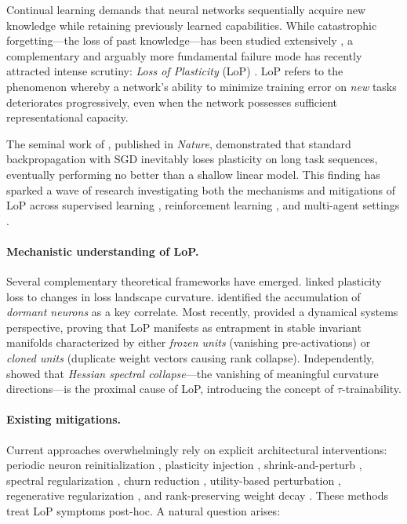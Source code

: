 \documentclass{article}
\theoremstyle{plain}
\theoremstyle{definition}
\theoremstyle{remark}
\begin{document}
Continual learning demands that neural networks sequentially acquire new knowledge while retaining previously learned capabilities. While catastrophic forgetting---the loss of past knowledge---has been studied extensively \citep{kirkpatrick2017ewc}, a complementary and arguably more fundamental failure mode has recently attracted intense scrutiny: \emph{Loss of Plasticity} (LoP) \citep{dohare2024loss, lyle2023understanding}. LoP refers to the phenomenon whereby a network's ability to minimize training error on \emph{new} tasks deteriorates progressively, even when the network possesses sufficient representational capacity.

The seminal work of \citet{dohare2024loss}, published in \emph{Nature}, demonstrated that standard backpropagation with SGD inevitably loses plasticity on long task sequences, eventually performing no better than a shallow linear model. This finding has sparked a wave of research investigating both the mechanisms and mitigations of LoP across supervised learning \citep{lewandowski2025spectral, farias2025snr, shin2024dash}, reinforcement learning \citep{sokar2023dormant, nikishin2023plasticity, juliani2024plasticity, tang2025mitigating}, and multi-agent settings \citep{qin2024reborn}.

\paragraph{Mechanistic understanding of LoP.} Several complementary theoretical frameworks have emerged. \citet{lyle2023understanding} linked plasticity loss to changes in loss landscape curvature. \citet{sokar2023dormant} identified the accumulation of \emph{dormant neurons} as a key correlate. Most recently, \citet{joudaki2026barriers} provided a dynamical systems perspective, proving that LoP manifests as entrapment in stable invariant manifolds characterized by either \emph{frozen units} (vanishing pre-activations) or \emph{cloned units} (duplicate weight vectors causing rank collapse). Independently, \citet{he2025spectral} showed that \emph{Hessian spectral collapse}---the vanishing of meaningful curvature directions---is the proximal cause of LoP, introducing the concept of $\tau$-trainability.

\paragraph{Existing mitigations.} Current approaches overwhelmingly rely on explicit architectural interventions: periodic neuron reinitialization \citep{sokar2023dormant, farias2025snr}, plasticity injection \citep{nikishin2023plasticity}, shrink-and-perturb \citep{ash2020warm, juliani2024plasticity}, spectral regularization \citep{lewandowski2025spectral}, churn reduction \citep{tang2025mitigating}, utility-based perturbation \citep{elsayed2024upgd}, regenerative regularization \citep{kumar2025l2init}, and rank-preserving weight decay \citep{wu2026rank}. These methods treat LoP symptoms post-hoc. A natural question arises:
\end{document}
